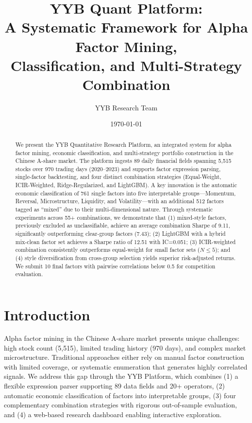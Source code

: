 \documentclass[11pt,a4paper]{ctexart}
\title{\textbf{YYB Quant Platform: \\ A Systematic Framework for Alpha Factor Mining, \\ Classification, and Multi-Strategy Combination}}
\author{YYB Research Team}
\date{\today}
\begin{document}
\maketitle

\begin{abstract}
We present the YYB Quantitative Research Platform, an integrated system for alpha factor mining, economic classification, and multi-strategy portfolio construction in the Chinese A-share market. The platform ingests 89 daily financial fields spanning 5,515 stocks over 970 trading days (2020--2023) and supports factor expression parsing, single-factor backtesting, and four distinct combination strategies (Equal-Weight, ICIR-Weighted, Ridge-Regularized, and LightGBM). A key innovation is the automatic economic classification of 761 single factors into five interpretable groups---Momentum, Reversal, Microstructure, Liquidity, and Volatility---with an additional 512 factors tagged as ``mixed'' due to their multi-dimensional nature. Through systematic experiments across 55+ combinations, we demonstrate that (1) mixed-style factors, previously excluded as unclassifiable, achieve an average combination Sharpe of 9.11, significantly outperforming clear-group factors (7.43); (2) LightGBM with a hybrid mix-clean factor set achieves a Sharpe ratio of 12.51 with IC=0.051; (3) ICIR-weighted combination consistently outperforms equal-weight for small factor sets ($N\leq5$); and (4) style diversification from cross-group selection yields superior risk-adjusted returns. We submit 10 final factors with pairwise correlations below 0.5 for competition evaluation.
\end{abstract}

\section{Introduction}

Alpha factor mining in the Chinese A-share market presents unique challenges: high stock count (5,515), limited trading history (970 days), and complex market microstructure. Traditional approaches either rely on manual factor construction with limited coverage, or systematic enumeration that generates highly correlated signals. We address this gap through the YYB Platform, which combines (1) a flexible expression parser supporting 89 data fields and 20+ operators, (2) automatic economic classification of factors into interpretable groups, (3) four complementary combination strategies with rigorous out-of-sample evaluation, and (4) a web-based research dashboard enabling interactive exploration.
\end{document}
